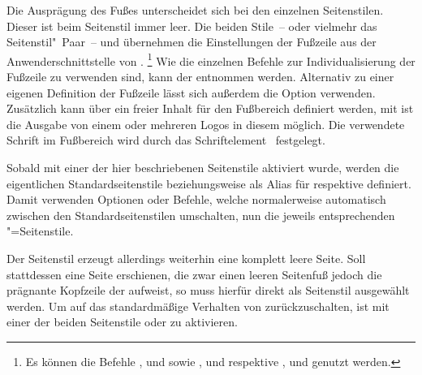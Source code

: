 \begin{DeclareEntity*}{}
\begin{DeclareEntity*}{}
\begin{DeclareEntity*}{}
\begin{Declaration}
\begin{Declaration}
\begin{Declaration}
Die Ausprägung des Fußes unterscheidet sich bei den einzelnen Seitenstilen. 
Dieser ist beim Seitenstil  immer leer. Die beiden 
Stile~-- oder vielmehr das Seitenstil"~Paar~--  und 
 übernehmen die Einstellungen der Fußzeile aus der 
Anwenderschnittstelle von .%
\footnote{%
  Es können die Befehle
  ,  und  sowie , 
   und  respektive ,  und 
   genutzt werden.%
}
Wie die einzelnen Befehle zur Individualisierung der Fußzeile zu verwenden 
sind, kann der  entnommen werden. Alternativ 
zu einer eigenen Definition der Fußzeile lässt sich außerdem die Option 
 verwenden. Zusätzlich kann über  ein freier 
Inhalt für den Fußbereich definiert werden, mit  ist die 
Ausgabe von einem oder mehreren Logos in diesem möglich. Die verwendete Schrift 
im Fußbereich wird durch das Schriftelement~ festgelegt.

Sobald mit  einer der hier beschriebenen 
Seitenstile aktiviert wurde, werden die eigentlichen Standardseitenstile 
 beziehungsweise  als Alias für 
 respektive  definiert. 
Damit verwenden Optionen oder Befehle, welche normalerweise automatisch 
zwischen den Standardseitenstilen umschalten, nun die jeweils entsprechenden 
"=Seitenstile.

Der Seitenstil  erzeugt allerdings weiterhin eine komplett 
leere Seite. Soll stattdessen eine Seite erschienen, die zwar einen leeren 
Seitenfuß jedoch die prägnante Kopfzeile der \TnUD aufweist, so muss hierfür 
direkt  als Seitenstil ausgewählt werden. Um auf 
das standardmäßige Verhalten von \KOMAScript zurückzuschalten, ist mit 
 einer der beiden Seitenstile 
 oder  zu aktivieren.%
%
\end{Declaration}
\end{Declaration}
\end{Declaration}


\end{DeclareEntity*}
\end{DeclareEntity*}
\end{DeclareEntity*}
